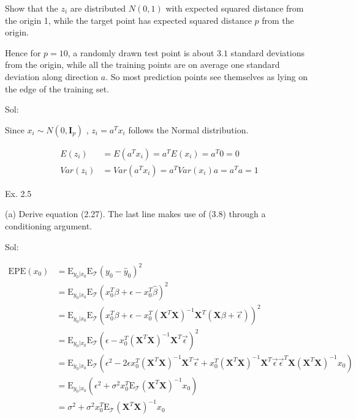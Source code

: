 \documentclass[english]{article}\usepackage[]{graphicx}\usepackage[]{color}
\begin{document}
Show that the $z_{i}$ are distributed $N(0,1)$ with expected squared
distance from the origin 1, while the target point has expected squared
distance $p$ from the origin.

Hence for $p=10$, a randomly drawn test point is about $3.1$ standard
deviations from the origin, while all the training points are on average
one standard deviation along direction $a$. So most prediction points
see themselves as lying on the edge of the training set.

\vspace{0.5cm}

Sol:

Since $x_{i}\sim N(0,\mathbf{I}_{p})$ , $z_{i}=a^{T}x_{i}$ follows
the Normal distribution. 

\begin{align*}
E(z_{i}) & =E(a^{T}x_{i})=a^{T}E(x_{i})=a^{T}0=0\\
Var(z_{i}) & =Var(a^{T}x_{i})=a^{T}Var(x_{i})a=a^{T}a=1
\end{align*}

\vspace{0.5cm}

Ex. 2.5

\vspace{0.5cm}

(a) Derive equation (2.27). The last line makes use of (3.8) through
a conditioning argument.

\vspace{0.5cm}

Sol:

\begin{align*}
\mathrm{EPE}(x_{0}) & =\mathrm{E}_{y_{0}|x_{0}}\mathrm{E}_{\mathcal{T}}(y_{0}-\hat{y}_{0})^{2}\\
 & =\mathrm{E}_{y_{0}|x_{0}}\mathrm{E}_{\mathcal{T}}(x_{0}^{T}\beta+\epsilon-x_{0}^{T}\hat{\beta})^{2}\\
 & =\mathrm{E}_{y_{0}|x_{0}}\mathrm{E}_{\mathcal{T}}(x_{0}^{T}\beta+\epsilon-x_{0}^{T}(\boldsymbol{X}^{T}\boldsymbol{X})^{-1}\boldsymbol{X}^{T}(\boldsymbol{X}\beta+\overrightarrow{\epsilon}))^{2}\\
 & =\mathrm{E}_{y_{0}|x_{0}}\mathrm{E}_{\mathcal{T}}(\epsilon-x_{0}^{T}(\boldsymbol{X}^{T}\boldsymbol{X})^{-1}\boldsymbol{X}^{T}\overrightarrow{\epsilon})^{2}\\
 & =\mathrm{E}_{y_{0}|x_{0}}\mathrm{E}_{\mathcal{T}}(\epsilon^{2}-2\epsilon x_{0}^{T}(\boldsymbol{X}^{T}\boldsymbol{X})^{-1}\boldsymbol{X}^{T}\overrightarrow{\epsilon}+x_{0}^{T}(\boldsymbol{X}^{T}\boldsymbol{X})^{-1}\boldsymbol{X}^{T}\overrightarrow{\epsilon}\overrightarrow{\epsilon}^{T}\boldsymbol{X}(\boldsymbol{X}^{T}\boldsymbol{X})^{-1}x_{0})\\
 & =\mathrm{E}_{y_{0}|x_{0}}(\epsilon^{2}+\sigma^{2}x_{0}^{T}\mathrm{E}_{\mathcal{T}}(\boldsymbol{X}^{T}\boldsymbol{X})^{-1}x_{0})\\
 & =\sigma^{2}+\sigma^{2}x_{0}^{T}\mathrm{E}_{\mathcal{T}}(\boldsymbol{X}^{T}\boldsymbol{X})^{-1}x_{0}
\end{align*}
\end{document}
